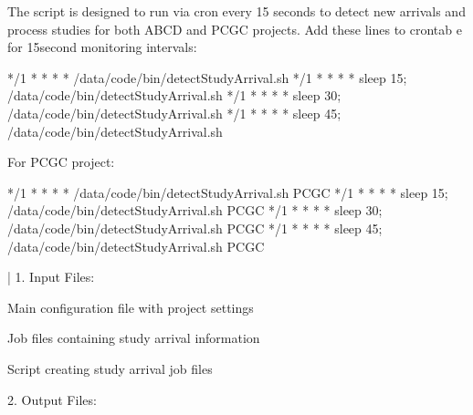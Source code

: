 \documentclass[letterpaper,10pt,english]{sphinxmanual}
\begin{document}
\sphinxAtStartPar
{}

\sphinxAtStartPar
The script is designed to run via cron every 15 seconds to detect new arrivals and process studies for both ABCD and PCGC projects.
Add these lines to crontab \sphinxhyphen{}e for 15\sphinxhyphen{}second monitoring intervals:

\begin{sphinxVerbatim}[commandchars=\\\{\}]
*/1 * * * * /data/code/bin/detectStudyArrival.sh
*/1 * * * * sleep 15; /data/code/bin/detectStudyArrival.sh
*/1 * * * * sleep 30; /data/code/bin/detectStudyArrival.sh
*/1 * * * * sleep 45; /data/code/bin/detectStudyArrival.sh
\end{sphinxVerbatim}

\sphinxAtStartPar
For PCGC project:

\begin{sphinxVerbatim}[commandchars=\\\{\}]
*/1 * * * * /data/code/bin/detectStudyArrival.sh PCGC
*/1 * * * * sleep 15; /data/code/bin/detectStudyArrival.sh PCGC
*/1 * * * * sleep 30; /data/code/bin/detectStudyArrival.sh PCGC
*/1 * * * * sleep 45; /data/code/bin/detectStudyArrival.sh PCGC
\end{sphinxVerbatim}

\sphinxAtStartPar
{}


\sphinxAtStartPar
{}
| 1. Input Files:

\begin{DUlineblock}{0em}
\item[] \sphinxhyphen{}  \sphinxhyphen{} Main configuration file with project settings
\item[] \sphinxhyphen{}  \sphinxhyphen{} Job files containing study arrival information
\item[] \sphinxhyphen{}  \sphinxhyphen{} Script creating study arrival job files
\end{DUlineblock}

\begin{DUlineblock}{0em}
\item[] 2. Output Files:
\end{DUlineblock}
\end{document}
